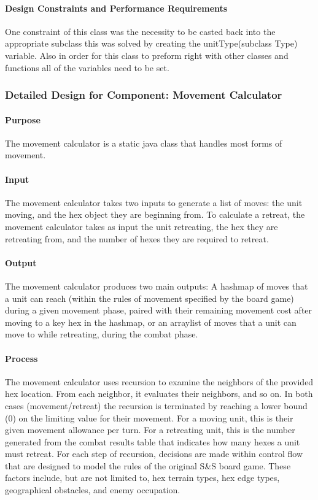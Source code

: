 \documentclass[12pt,a4paper,titlepage]{article}
\begin{document}
\paragraph{Design Constraints and Performance Requirements} One constraint of this class was the necessity to be casted back into the appropriate subclass this was solved by creating the unitType(subclass Type) variable. Also in order for this class to preform right with other classes and functions all of the variables need to be set. 

\subsubsection{Detailed Design for Component: Movement Calculator}
\paragraph{Purpose} The movement calculator is a static java class that handles most forms of movement. 
\paragraph{Input} The movement calculator takes two inputs to generate a list of moves: the unit moving, and the hex object they are beginning from. To calculate a retreat, the movement calculator takes as input the unit retreating, the hex they are retreating from, and the number of hexes they are required to retreat.
\paragraph{Output} The movement calculator produces two main outputs: A hashmap of moves that a unit can reach (within the rules of movement specified by the board game) during a given movement phase, paired with their remaining movement cost after moving to a key hex in the hashmap, or an arraylist of moves that a unit can move to while retreating, during the combat phase.
\paragraph{Process} The movement calculator uses recursion to examine the neighbors of the provided hex location. From each neighbor, it evaluates their neighbors, and so on. In both cases (movement/retreat) the recursion is terminated by reaching a lower bound (0) on the limiting value for their movement. For a moving unit, this is their given movement allowance per turn. For a retreating unit, this is the number generated from the combat results table that indicates how many hexes a unit must retreat. For each step of recursion, decisions are made within control flow that are designed to model the rules of the original S\&S board game. These factors include, but are not limited to, hex terrain types, hex edge types, geographical obstacles, and enemy occupation. 
\end{document}

